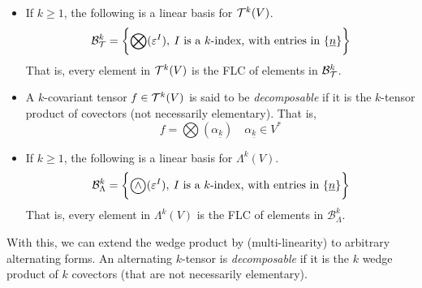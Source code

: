 \documentclass[../main-v2-manifolds.tex]{subfiles}
\begin{document}
\begin{itemize}
    \item If $k\geq 1$, the following is a linear basis for $\mathcal{T}^k(V)$.
    \begin{equation}
        \mathcal{B}^k_{\mathcal{T}} = \biggl\{{\bigotimes(\varepsilon^{I}),\: I\text{ is a }k\text{-index, with entries in }\{\underline{n}\}}\biggr\}
        \label{eq:k tensor basis}
    \end{equation}
    That is, every element in $\mathcal{T}^k(V)$ is the FLC of elements in $\mathcal{B}^k_{\mathcal{T}}$. 
    \item A $k$-covariant tensor $f\in \mathcal{T}^k(V)$ is said to be \emph{decomposable} if it is the $k$-tensor product of covectors (not necessarily elementary). That is, 
    \[
        f=\bigotimes(\alpha_{\underline{k}})\quad\alpha_{\underline{k}}\in V^*
    \]
    \item If $k\geq 1$, the following is a linear basis for $\Lambda^k(V)$.
    \begin{equation}
        \mathcal{B}^k_{\Lambda} = \bigset{\bigowedge(\varepsilon^{I}),\: I\text{ is a }k\text{-index, with entries in }\{\underline{n}\}}
        \label{eq:k tensor basis}
    \end{equation}
    That is, every element in $\Lambda^k(V)$ is the FLC of elements in $\mathcal{B}^k_{\Lambda}$.
\end{itemize}
With this, we can extend the wedge product by (multi-linearity) to arbitrary alternating forms. An alternating $k$-tensor is \emph{decomposable} if it is the $k$ wedge product of $k$ covectors (that are not necessarily elementary).\\
\end{document}
